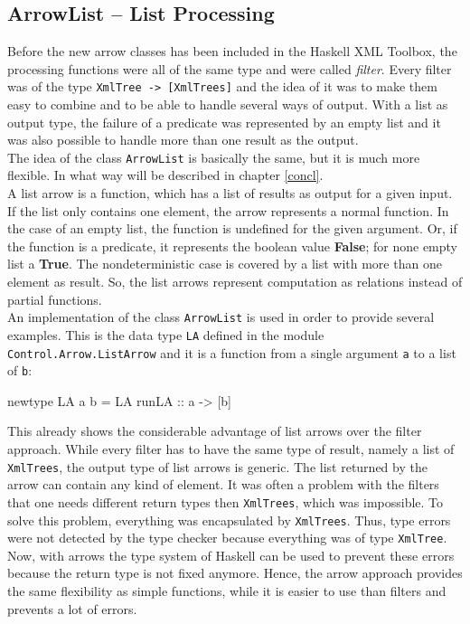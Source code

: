 \documentclass[11pt,a4paper,headsepline, bibtotoc]{scrreprt}
\begin{document}
\subsection{ArrowList -- List Processing}\label{arrowlist}
Before the new arrow classes has been included in the Haskell XML Toolbox, the processing functions were all of the same type and were called \textit{filter}. Every filter was of the type \texttt{XmlTree -> [XmlTrees]} and the idea of it was to make them easy to combine and to be able to handle several ways of output. With a list as output type, the failure of a predicate was represented by an empty list and it was also possible to handle more than one result as the output.\\
The idea of the class \texttt{ArrowList} is basically the same, but it is much more flexible. In what way will be described in chapter \ref{concl}.\\
A list arrow is a function, which has a list of results as output for a given input. If the list only contains one element, the arrow represents a normal function. In the case of an empty list, the function is undefined for the given argument. Or, if the function is a predicate, it represents the boolean value \textbf{False}; for none empty list a \textbf{True}. The nondeterministic case is covered by a list with more than one element as result. So, the list arrows represent computation as relations instead of partial functions.\\
An implementation of the class \texttt{ArrowList} is used in order to provide several examples. This is the data type \texttt{LA} defined in the module \texttt{Control.Arrow.ListArrow} and it is a function from a single argument \texttt{a} to a list of \texttt{b}:
\begin{code}
newtype LA a b = LA { runLA :: a -> [b] }
\end{code}
This already shows the considerable advantage of list arrows over the filter approach. While every filter has to have the same type of result, namely a list of \texttt{XmlTrees}, the output type of list arrows is generic. The list returned by the arrow can contain any kind of element. It was often a problem with the filters that one needs different return types then \texttt{XmlTrees}, which was impossible. To solve this problem, everything was encapsulated by \texttt{XmlTrees}. Thus, type errors were not detected by the type checker because everything was of type \texttt{XmlTree}. Now, with arrows the type system of Haskell can be used to prevent these errors because the return type is not fixed anymore. Hence, the arrow approach provides the same flexibility as simple functions, while it is easier to use than filters and prevents a lot of errors.\\  
\end{document}
